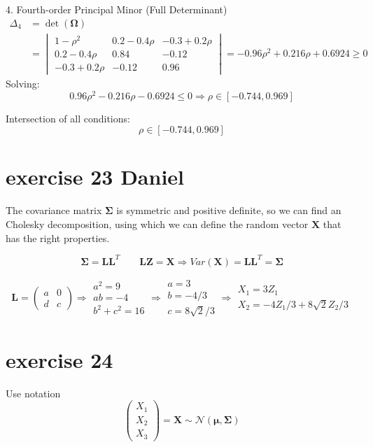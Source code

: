\documentclass{article}
\let\normalmu\mu
\let\normalSigma\Sigma
\renewcommand{\mu}{\bm{\normalmu}} %
\renewcommand{\Sigma}{\bm{\normalSigma}} %
\begin{document}
4. Fourth-order Principal Minor (Full Determinant)
\begin{align*}
\Delta_4 &= \det(\bm{\Omega}) \\
&=\begin{vmatrix}
1-\rho^2 & 0.2-0.4\rho & -0.3+0.2\rho \\
0.2-0.4\rho & 0.84 & -0.12 \\
-0.3+0.2\rho & -0.12 & 0.96
\end{vmatrix} 
=-0.96\rho^2 + 0.216\rho + 0.6924 \geq 0
\end{align*}
Solving:
\[
0.96\rho^2 - 0.216\rho - 0.6924 \leq 0 \Rightarrow \rho \in [-0.744, 0.969]
\]

Intersection of all conditions:
\[
\rho \in [-0.744, 0.969]
\]

\section{exercise 23 Daniel}
The covariance matrix $\mathbf{\Sigma}$ is symmetric and positive definite,
so we can find an Cholesky decomposition,
using which we can define the random vector $\mathbf{X}$ that has the right properties.

\[{\mathbf{\Sigma }} = {\mathbf{L}}{{\mathbf{L}}^T}\qquad {\mathbf{LZ}} = {\mathbf{X}} \Rightarrow Var\left( {\mathbf{X}} \right) = {\mathbf{L}}{{\mathbf{L}}^T} = {\mathbf{\Sigma }}\]

\[{\mathbf{L}} = \left( {\begin{array}{*{20}{c}}
            a & 0 \\
            d & c
        \end{array}} \right) \Rightarrow \begin{array}{*{20}{c}}
        {{a^2} = 9} \\
        {ab =  - 4} \\
        {{b^2} + {c^2} = 16}
    \end{array} \Rightarrow \begin{array}{*{20}{c}}
        {a = 3}      \\
        {b =  - 4/3} \\
        {c = 8\sqrt 2 /3}
    \end{array} \Rightarrow \begin{array}{*{20}{c}}
        {{X_1} = 3{Z_1}} \\
        {{X_2} =  - 4{Z_1}/3 + 8\sqrt 2 {Z_2}/3}
    \end{array}
\]

\section{exercise 24}
Use notation
\[\left( {\begin{array}{*{20}{c}}
            {{X_1}} \\
            {{X_2}} \\
            {{X_3}}
        \end{array}} \right) = {\mathbf{X}}\sim\mathcal{N}\left( {{\mathbf{\mu }},{\mathbf{\Sigma }}} \right)\]
\end{document}
